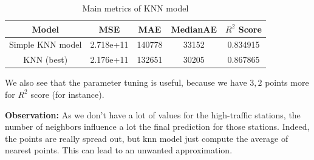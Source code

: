 \begin{table}[h]
    \centering
    \begin{tabular}{ccccc}
        \toprule
        Model &  MSE &  MAE & MedianAE & $R^2$ Score \\
        \midrule
        Simple KNN model & 2.718e+11 & 140778 & 33152 & 0.834915\\
        KNN (best) & 2.176e+11 & 132651 & 30205 & 0.867865\\
        \bottomrule
    \end{tabular}
    \caption{Main metrics of KNN model}
\end{table}
We also see that the parameter tuning is useful, because we have $3,2$ points more for $R^2$ score (for instance).

\textbf{Observation:} As we don't have a lot of values for the high-traffic stations, the number of neighbors influence a lot the final prediction for those stations. Indeed, the points are really spread out, but knn model just compute the average of nearest points. This can lead to an unwanted approximation.